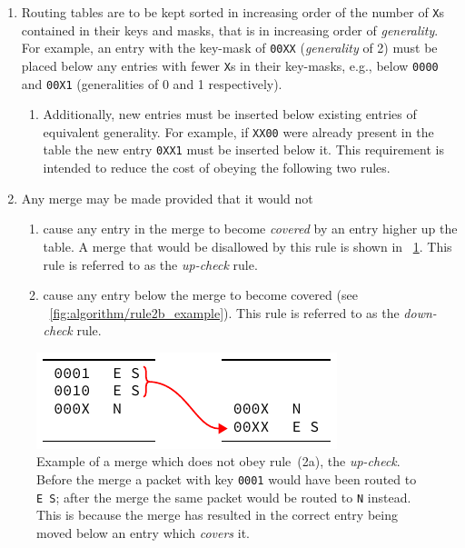 \documentclass[conference]{IEEEtran}
\newcommand{\mytt}[1]{\texttt{\footnotesize#1}}
\begin{document}
  \begin{enumerate}[\IEEEsetlabelwidth{2)}]
    \item Routing tables are to be kept sorted in increasing order of the number of \mytt{X}s contained in their keys and masks, that is in increasing order of \textit{generality}.
      For example, an entry with the key-mask of \mytt{00XX} (\textit{generality} of 2) must be placed below any entries with fewer \mytt{X}s in their key-masks, e.g., below \mytt{0000} and \mytt{00X1} (generalities of 0 and 1 respectively).
      \begin{enumerate}[\IEEEsetlabelwidth{a)}]
        \item Additionally, new entries must be inserted below existing entries of equivalent generality.
              For example, if \mytt{XX00} were already present in the table the new entry \mytt{0XX1} must be inserted below it.
              This requirement is intended to reduce the cost of obeying the following two rules.
      \end{enumerate}
    \item Any merge may be made provided that it would not
      \begin{enumerate}[\IEEEsetlabelwidth{b)}]
        \item cause any entry in the merge to become \textit{covered} by an entry higher up the table.
              A merge that would be disallowed by this rule is shown in \figurename~\ref{fig:algorithm/rule2a_example}.
              This rule is referred to as the \textit{up-check} rule.
        \item cause any entry below the merge to become covered (see \figurename~\ref{fig:algorithm/rule2b_example}).
              This rule is referred to as the \textit{down-check} rule.
      \end{enumerate}
  \end{enumerate}

  \begin{figure}
    \centering
    \includegraphics{figures/rule2a_example}
    \caption{
      Example of a merge which does not obey rule~(2a), the \textit{up-check}.
      Before the merge a packet with key \mytt{0001} would have been routed to \mytt{E~S}; after the merge the same packet would be routed to \mytt{N} instead.
      This is because the merge has resulted in the correct entry being moved below an entry which \textit{covers} it.
    }
    \label{fig:algorithm/rule2a_example}
  \end{figure}
\end{document}
